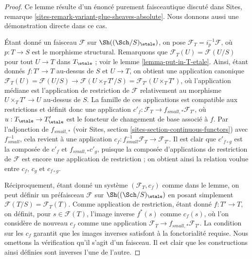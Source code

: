 \begin{proof}
Ce lemme résulte d'un énoncé purement faisceautique discuté dans
Sites, remarque \ref{sites-remark-variant-glue-sheaves-absolute}.
Nous donnons aussi une démonstration directe dans ce cas.

\medskip\noindent
Étant donné un faisceau $\mathcal{F}$ sur $\Sh((\Sch/S)_\etale)$,
on pose $\mathcal{F}_T = i_p^{-1}\mathcal{F}$, où $p : T \to S$
est le morphisme structural. Remarquons que
$\mathcal{F}_T(U) = \mathcal{F}(U/S)$ pour tout $U \to T$
dans $T_\etale$ ; voir le lemme \ref{lemma-put-in-T-etale}.
Ainsi, étant donnés $f : T' \to T$ au-dessus de $S$ et $U \to T$, on obtient une
application canonique $\mathcal{F}_T(U) = \mathcal{F}(U/S) \to \mathcal{F}(U \times_T T'/S)
= \mathcal{F}_{T'}(U \times_T T')$, où l'application médiane est l'application de restriction
de $\mathcal{F}$ relativement au morphisme
$U \times_T T' \to U$ au-dessus de $S$. La famille de ces applications est
compatible aux restrictions et définit donc une application
$c'_f : \mathcal{F}_T \to f_{small, *}\mathcal{F}_{T'}$, où
$u : T_\etale \to T'_\etale$ est le foncteur de changement de base
associé à $f$. Par l'adjonction de $f_{small, *}$ (voir
Sites, section \ref{sites-section-continuous-functors}) avec
$f_{small}^{-1}$, cela revient à une application
$c_f : f_{small}^{-1}\mathcal{F}_T \to \mathcal{F}_{T'}$.
Il est clair que $c'_{f \circ g}$ est la composée de
$c'_f$ et $f_{small, *}c'_g$, puisque la composée d'applications de restriction
de $\mathcal{F}$ est encore une application de restriction ; on obtient ainsi la
relation voulue entre $c_f$, $c_g$ et $c_{f \circ g}$.

\medskip\noindent
Réciproquement, étant donné un système $(\mathcal{F}_T, c_f)$ comme dans le lemme,
on peut définir un préfaisceau $\mathcal{F}$ sur
$\Sh((\Sch/S)_\etale)$
en posant simplement $\mathcal{F}(T/S) = \mathcal{F}_T(T)$. Comme application de restriction,
étant donné $f : T' \to T$, on définit, pour $s \in \mathcal{F}(T)$,
l'image inverse $f^*(s)$ comme $c_f(s)$, où l'on considère de nouveau $c_f$ comme
une application $\mathcal{F}_T \to f_{small, *}\mathcal{F}_{T'}$.
La condition sur les $c_f$ garantit que
les images inverses satisfont à la fonctorialité requise.
Nous omettons la vérification qu'il s'agit d'un faisceau.
Il est clair que les constructions ainsi définies sont inverses l'une de l'autre.
\end{proof}























